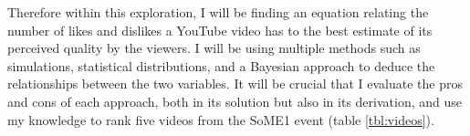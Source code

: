\documentclass[a4paper,11pt]{article}
\begin{document}

Therefore within this exploration, I will be finding an equation relating the number of likes and dislikes a YouTube video has to the best estimate of its perceived quality by the viewers. I will be using multiple methods such as simulations, statistical distributions, and a Bayesian approach to deduce the relationships between the two variables. It will be crucial that I evaluate the pros and cons of each approach, both in its solution but also in its derivation, and use my knowledge to rank five videos from the SoME1 event (table \ref{tbl:videos}).





\end{document}
